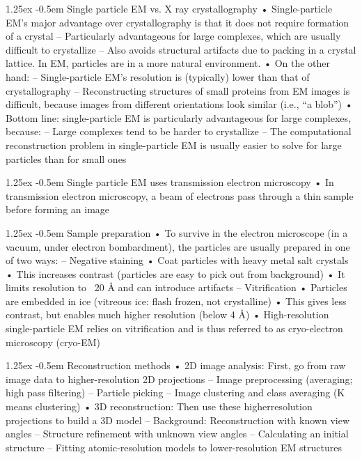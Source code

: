 \documentclass[8pt]{article}
\makeatletter
\newlength{\norm}
\newlength{\nrm}
\newlength{\sm}
\renewcommand{\paragraph}{%
  \@startsection{paragraph}{4}%
  {\z@}{1.25ex \@plus 2pt \@minus 2pt}{-0.5em}%
  {\fontsize{\f@size}{\nrm}\normalfont\bfseries}%
}
\makeatother
\begin{document}
\paragraph{Single particle EM vs. X ray crystallography}
• Single-particle EM’s major advantage over crystallography is that it
does not require formation of a crystal
– Particularly advantageous for large complexes, which are usually difficult
to crystallize
– Also avoids structural artifacts due to packing in a crystal lattice. In EM,
particles are in a more natural environment.
• On the other hand:
– Single-particle EM’s resolution is (typically) lower than that of
crystallography
– Reconstructing structures of small proteins from EM images is difficult,
because images from different orientations look similar (i.e., “a blob”)
• Bottom line: single-particle EM is particularly advantageous for
large complexes, because:
– Large complexes tend to be harder to crystallize
– The computational reconstruction problem in single-particle EM is usually
easier to solve for large particles than for small ones

\paragraph{Single particle EM uses transmission electron microscopy}
• In transmission electron microscopy, a beam of
electrons pass through a thin sample before
forming an image 

\paragraph{Sample preparation}
• To survive in the electron microscope (in a vacuum,
under electron bombardment), the particles are
usually prepared in one of two ways:
– Negative staining
• Coat particles with heavy metal salt crystals
• This increases contrast (particles are easy to pick out from
background)
• It limits resolution to ~20 Å and can introduce artifacts
– Vitrification
• Particles are embedded in ice (vitreous ice: flash frozen, not
crystalline)
• This gives less contrast, but enables much higher resolution
(below 4 Å)
• High-resolution single-particle EM relies on vitrification and is
thus referred to as cryo-electron microscopy (cryo-EM)

\paragraph{Reconstruction methods}
• 2D image analysis: First, go from raw image
data to higher-resolution 2D projections
– Image preprocessing (averaging; high pass filtering)
– Particle picking
– Image clustering and class averaging (K means clustering)
• 3D reconstruction: Then use these higherresolution
projections to build a 3D model
– Background: Reconstruction with known view angles
– Structure refinement with unknown view angles
– Calculating an initial structure
– Fitting atomic-resolution models to lower-resolution
EM structures
\end{document}
